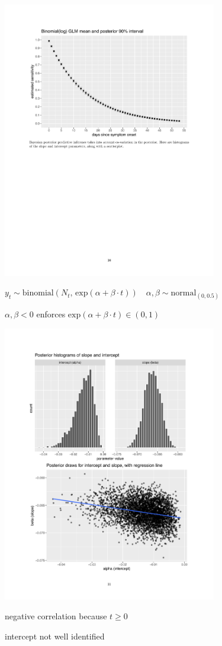 \documentclass[9pt]{report}
\begin{document}
\includegraphics[width=0.7\textwidth]{img/bayes-binomial-log.pdf}
\vspace*{-3pt}
\begin{subitemize}
\item $y_t \sim \textrm{binomial}\left(N_t, \, \textrm{exp}(\alpha +
  \beta \cdot t)\right)
\quad \alpha, \beta \sim \textrm{normal}_(0, 0.5)$
\item $\alpha, \beta < 0$ enforces $\textrm{exp}(\alpha + \beta \cdot
  t) \in (0, 1)$
\end{subitemize}


\includegraphics[width=0.7\textwidth]{img/binomial-log-scatter.pdf}
\begin{subitemize}
\item negative correlation because $t \geq 0$
\item intercept not well identified
\end{subitemize}
\end{document}
